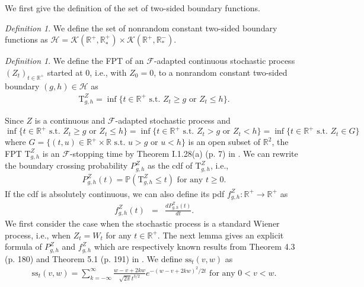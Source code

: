 \documentclass[aop]{imsart}
\theoremstyle{plain}
\theoremstyle{remark}
\newtheorem{definition}[theorem]{Definition}
\newcommand{\reels}{\mathbb{R}}
\newcommand{\proba}{\mathbb{P}}
\newcommand{\Tau}{\mathrm{T}}
\begin{document}
We first give the definition of the set of two-sided boundary functions. 
\begin{definition}\label{defboundaryset_nrc2}
We define the set of nonrandom constant two-sided boundary functions as $\mathcal{H} = \mathcal{K} (\reels^+,\reels_*^+) \times \mathcal{K} (\reels^+,\reels_*^-).$
\end{definition} 
\begin{definition}\label{defFPT_nrc2}
We define the FPT of an $\mathcal{F}$-adapted continuous stochastic process $(Z_t)_{t \in \reels^+}$ started at 0, i.e., with $Z_0=0$, to a nonrandom constant two-sided boundary
$(g,h) \in \mathcal{H}$ as
\begin{eqnarray}
\label{TgZdef_nrc2}
\Tau_{g,h}^Z = \inf \{t \in \reels^+ \text{ s.t. } Z_t \geq g \text{ or } Z_t \leq h \}.
\end{eqnarray}
\end{definition}
\noindent Since $Z$ is a continuous and 
$\mathcal{F}$-adapted stochastic process and $\inf \{t \in \reels^+ \text{ s.t. } Z_t \geq g \text{ or } Z_t \leq h \} = \inf \{t \in \reels^+ \text{ s.t. } Z_t > g \text{ or } Z_t < h \} = \inf \{t \in \reels^+ \text{ s.t. } Z_t \in G\}$ where $G= \{(t,u) \in \reels^+ \times \reels \text{ s.t. } u > g \text{ or } u < h \}$ is an open subset of $\reels^2$, the FPT $\Tau_{g,h}^{Z}$ is an $\mathcal{F}$-stopping time by Theorem I.1.28(a) (p. 7) in \cite{JacodLimit2003}. We can rewrite the boundary crossing probability $P_{g,h}^Z$ as the cdf of $\Tau_{g,h}^Z$, i.e., 
\begin{eqnarray}
\label{PgZdef_nrc2}
P_{g,h}^Z(t)= \proba (\Tau^Z_{g,h} \leq t) \text{ for any } t \geq 0.
\end{eqnarray}
If the cdf is absolutely continuous, we can also define its pdf $f_{g,h}^Z: \reels^+  \rightarrow  \reels^+$ as
\begin{eqnarray}
\label{fZgt_nrc2}
f_{g,h}^Z(t) & = & \frac{dP_{g,h}^Z(t)}{dt}.
\end{eqnarray}
We first consider the case when the stochastic process is a standard Wiener process, i.e., when $Z_t = W_t$ for any $t \in \reels^+$. The next lemma gives an explicit formula of $P_{g,h}^Z$ and $f_{g,h}^Z$ which are respectively known results from Theorem 4.3 (p. 180) and Theorem 5.1 (p. 191) in \cite{anderson1960modification}.
We define $\mathrm{ss}_{t}(v, w)$ as
\begin{eqnarray}
\label{sst}
 \displaystyle \mathrm{ss}_{t}(v, w)=\sum_{k=-\infty}^{\infty} \frac{w-v+2 k w}{\sqrt{2 \pi} t^{3 / 2}} e^{-(w-v+2 k w)^{2} / 2 t} \text{ for any } 0<v<w .  
\end{eqnarray}
\end{document}
